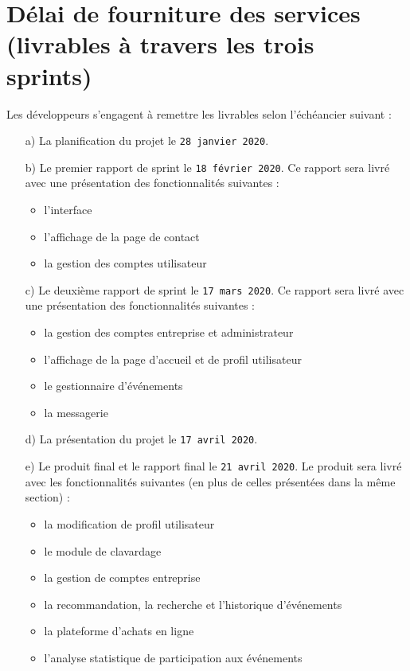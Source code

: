 \documentclass[letter,12pt]{exam}
\begin{document}
\section{Délai de fourniture des services\\ (livrables à travers les
trois
sprints)}

Les développeurs s'engagent à remettre les livrables selon l'échéancier
suivant :

\begin{itemize}
\tightlist
\item[a)]
  La planification du projet le \texttt{28\ janvier\ 2020}.
\item[b)]
  Le premier rapport de sprint le \texttt{18\ février\ 2020}. Ce rapport
  sera livré avec une présentation des fonctionnalités suivantes :

  \begin{itemize}
  \tightlist
  \item
    l'interface
  \item
    l'affichage de la page de contact
  \item
    la gestion des comptes utilisateur
  \end{itemize}
\item[c)]
  Le deuxième rapport de sprint le \texttt{17\ mars\ 2020}. Ce rapport
  sera livré avec une présentation des fonctionnalités suivantes :

  \begin{itemize}
  \tightlist
  \item
    la gestion des comptes entreprise et administrateur
  \item
    l'affichage de la page d'accueil et de profil utilisateur
  \item
    le gestionnaire d'événements
  \item
    la messagerie
  \end{itemize}
\item[d)]
  La présentation du projet le \texttt{17\ avril\ 2020}.
\item[e)]
  Le produit final et le rapport final le \texttt{21\ avril\ 2020}. Le
  produit sera livré avec les fonctionnalités suivantes (en plus de
  celles présentées dans la même section) :

  \begin{itemize}
  \tightlist
  \item
    la modification de profil utilisateur
  \item
    le module de clavardage
  \item
    la gestion de comptes entreprise
  \item
    la recommandation, la recherche et l'historique d'événements
  \item
    la plateforme d'achats en ligne
  \item
    l'analyse statistique de participation aux événements
  \end{itemize}
\end{itemize}
\end{document}

